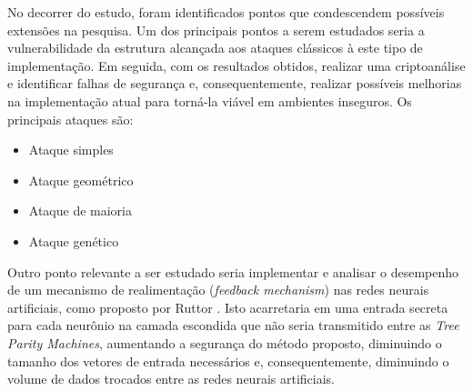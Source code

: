 \documentclass[12pt]{article}
\begin{document}
            No decorrer do estudo, foram identificados pontos que condescendem possíveis extensões na pesquisa. Um dos principais pontos a serem estudados seria a vulnerabilidade da estrutura alcançada aos ataques clássicos à este tipo de implementação. Em seguida, com os resultados obtidos, realizar uma criptoanálise e identificar falhas de segurança e, consequentemente, realizar possíveis melhorias na implementação atual para torná-la viável em ambientes inseguros.
            Os principais ataques são:
            \begin{itemize}
                \item Ataque simples \cite{ruttor2006genetic}
                \item Ataque geométrico \cite{klimov2002analysis}
                \item Ataque de maioria \cite{ruttor2007neural}
                \item Ataque genético \cite{ruttor2006genetic}\cite{klimov2002analysis}
            \end{itemize}
            
            \clearpage
            \newpage

            Outro ponto relevante a ser estudado seria implementar e analisar o desempenho de um mecanismo de realimentação (\textit{feedback mechanism}) nas redes neurais artificiais, como proposto por Ruttor \cite{ruttor2007neural}. Isto acarretaria em uma entrada secreta para cada neurônio na camada escondida que não seria transmitido entre as \textit{Tree Parity Machines}, aumentando a segurança do método proposto, diminuindo o tamanho dos vetores de entrada necessários e, consequentemente, diminuindo o volume de dados trocados entre as redes neurais artificiais.
  
    
    

\flushend 
\end{document}
